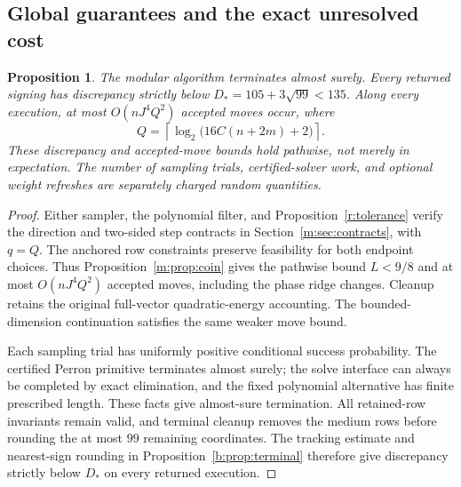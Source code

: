 \documentclass[11pt]{amsart}
\newtheorem{proposition}[theorem]{Proposition}
\theoremstyle{definition}\newtheorem{definition}[theorem]{Definition}
\theoremstyle{remark}\newtheorem{remark}[theorem]{Remark}
\numberwithin{equation}{section}
\begin{document}
\subsection{Global guarantees and the exact unresolved cost}\label{a:guarantees}
\begin{proposition}\label{a:budgets}
The modular algorithm terminates almost surely. Every returned signing
has discrepancy strictly below $D_*=105+3\sqrt{99}<135$. Along every
execution, at most $O(nJ^4Q^2)$ accepted moves occur, where
\[
 Q=\left\lceil\log_2\bigl(16C(n+2m)+2\bigr)\right\rceil.
\]
These discrepancy and accepted-move bounds hold pathwise, not merely in
expectation. The number of sampling trials, certified-solver work, and
optional weight refreshes are separately charged random quantities.
\end{proposition}
\begin{proof}
Either sampler, the polynomial filter, and Proposition~\ref{r:tolerance} verify
the direction and two-sided step contracts in
Section~\ref{m:sec:contracts}, with $q=Q$. The anchored row constraints
preserve feasibility for both endpoint choices. Thus
Proposition~\ref{m:prop:coin} gives the pathwise bound $L<9/8$ and at most
$O(nJ^4Q^2)$ accepted moves, including the phase ridge changes.
Cleanup retains the original full-vector quadratic-energy accounting.
The bounded-dimension continuation satisfies the same weaker move bound.

Each sampling trial has uniformly positive conditional success
probability. The certified Perron primitive terminates almost surely;
the solve interface can always be completed by exact elimination, and the
fixed polynomial alternative has finite prescribed length.
These facts give almost-sure termination. All retained-row invariants
remain valid, and terminal cleanup removes the medium rows before
rounding the at most $99$ remaining coordinates. The tracking estimate
and nearest-sign rounding in Proposition~\ref{b:prop:terminal} therefore
give discrepancy strictly below $D_*$ on every returned execution.
\end{proof}
\end{document}
